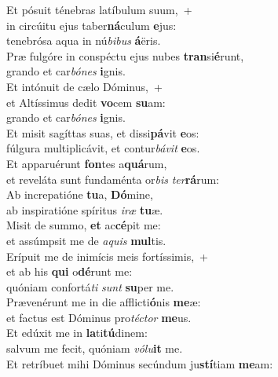 \oddverse Et pósuit ténebras latíbulum suum,~+\\
\oddverse  in circúitu ejus taber\textbf{ná}culum \textbf{e}jus:~\*\\
\oddverse tenebrósa aqua in nú\textit{bi}\textit{bus} \textbf{á}ëris.\\
\evenverse Præ fulgóre in conspéctu ejus nubes \textbf{tran}si\textbf{é}runt,~\*\\
\evenverse grando et car\textit{bó}\textit{nes} \textbf{i}gnis.\\
\oddverse Et intónuit de cælo Dóminus,~+\\
\oddverse  et Altíssimus dedit \textbf{vo}cem \textbf{su}am:~\*\\
\oddverse grando et car\textit{bó}\textit{nes} \textbf{i}gnis.\\
\evenverse Et misit sagíttas suas, et dissi\textbf{pá}vit \textbf{e}os:~\*\\
\evenverse fúlgura multiplicávit, et contur\textit{bá}\textit{vit} \textbf{e}os.\\
\oddverse Et apparuérunt \textbf{fon}tes a\textbf{quá}rum,~\*\\
\oddverse et reveláta sunt fundaménta or\textit{bis} \textit{ter}\textbf{rá}rum:\\
\evenverse Ab increpatióne \textbf{tu}a, \textbf{Dó}mine,~\*\\
\evenverse ab inspiratióne spíritus \textit{i}\textit{ræ} \textbf{tu}æ.\\
\oddverse Misit de summo, \textbf{et} ac\textbf{cé}pit me:~\*\\
\oddverse et assúmpsit me de \textit{a}\textit{quis} \textbf{mul}tis.\\
\evenverse Erípuit me de inimícis meis fortíssimis,~+\\
\evenverse  et ab his \textbf{qui} o\textbf{dé}runt me:~\*\\
\evenverse quóniam confortá\textit{ti} \textit{sunt} \textbf{su}per me.\\
\oddverse Prævenérunt me in die afflicti\textbf{ó}nis \textbf{me}æ:~\*\\
\oddverse et factus est Dóminus pro\textit{té}\textit{ctor} \textbf{me}us.\\
\evenverse Et edúxit me in \textbf{la}ti\textbf{tú}dinem:~\*\\
\evenverse salvum me fecit, quóniam \textit{vó}\textit{lu}\textbf{it} me.\\
\oddverse Et retríbuet mihi Dóminus secúndum ju\textbf{stí}tiam \textbf{me}am:~\*\\
